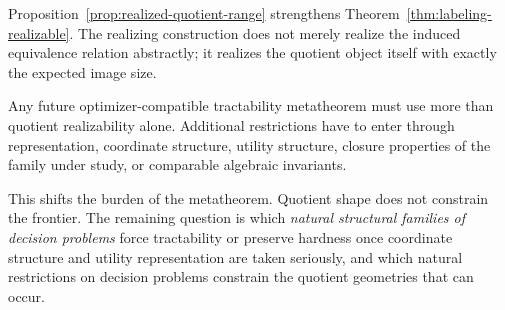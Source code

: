 Proposition~\ref{prop:realized-quotient-range} strengthens Theorem~\ref{thm:labeling-realizable}. The realizing construction does not merely realize the induced equivalence relation abstractly; it realizes the quotient object itself with exactly the expected image size.

\begin{corollary}\label{cor:realizability-alone-not-enough}
Any future optimizer-compatible tractability metatheorem must use more than quotient realizability alone. Additional restrictions have to enter through representation, coordinate structure, utility structure, closure properties of the family under study, or comparable algebraic invariants.
\end{corollary}

This shifts the burden of the metatheorem. Quotient shape does not constrain the frontier. The remaining question is which \emph{natural structural families of decision problems} force tractability or preserve hardness once coordinate structure and utility representation are taken seriously, and which natural restrictions on decision problems constrain the quotient geometries that can occur.
